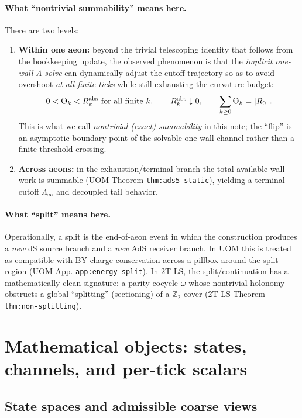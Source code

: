 \documentclass[11pt]{article}
\theoremstyle{definition}
\theoremstyle{plain}
\theoremstyle{remark}
\newcommand{\Ztwo}{\mathbb Z_2}
\newcommand{\abs}[1]{\left\lvert #1\right\rvert}
\begin{document}
\paragraph{What ``nontrivial summability'' means here.}
There are two levels:
\begin{enumerate}[leftmargin=2em]
\item \textbf{Within one aeon:} beyond the trivial telescoping identity that follows from the bookkeeping update,
the observed phenomenon is that the \emph{implicit one-wall $\Lambda$-solve} can dynamically adjust the cutoff trajectory
so as to avoid overshoot \emph{at all finite ticks} while still exhausting the curvature budget:
\[
0<\Theta_k<R^{\rm abs}_k\ \text{for all finite }k,
\qquad
R^{\rm abs}_k\downarrow 0,
\qquad
\sum_{k\ge 0}\Theta_k=\abs{R_0}.
\]
This is what we call \emph{nontrivial (exact) summability} in this note; the ``flip'' is an asymptotic boundary point of
the solvable one-wall channel rather than a finite threshold crossing.
\item \textbf{Across aeons:} in the exhaustion/terminal branch the total available wall-work is summable (UOM Theorem
\texttt{thm:ads5-static}), yielding a terminal cutoff $\Lambda_\infty$ and decoupled tail behavior.
\end{enumerate}

\paragraph{What ``split'' means here.}
Operationally, a split is the end-of-aeon event in which the construction produces a \emph{new} dS source branch and a
\emph{new} AdS receiver branch. In UOM this is treated as compatible with BY charge conservation across a pillbox around
the split region (UOM App. \texttt{app:energy-split}). In 2T-LS, the split/continuation has a mathematically clean
signature: a parity cocycle $\omega$ whose nontrivial holonomy obstructs a global ``splitting'' (sectioning) of a
$\Ztwo$-cover (2T-LS Theorem \texttt{thm:non-splitting}).

\section{Mathematical objects: states, channels, and per-tick scalars}
\label{sec:objects}

\subsection{State spaces and admissible coarse views}
\label{subsec:state-spaces}
\end{document}
